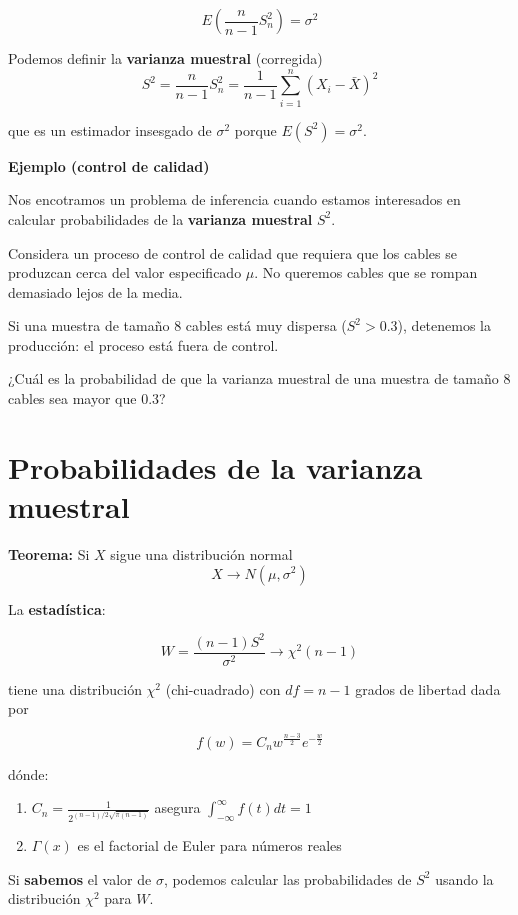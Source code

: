\documentclass[
]{book}
\providecommand{\tightlist}{%
  \setlength{\itemsep}{0pt}\setlength{\parskip}{0pt}}
\begin{document}
\[E(\frac{n}{n-1}S_n^2)=\sigma^2\]

Podemos definir la \textbf{varianza muestral} (corregida) \[S^2=\frac{n}{n-1}S_n^2=\frac{1}{n-1}\sum_{i=1}^n (X_i-\bar{X})^2\]

que es un estimador insesgado de \(\sigma^2\) porque \(E(S^2)=\sigma^2\).

\textbf{Ejemplo (control de calidad)}

Nos encotramos un problema de inferencia cuando estamos interesados en calcular probabilidades de la \textbf{varianza muestral} \(S^2\).

Considera un proceso de control de calidad que requiera que los cables se produzcan cerca del valor especificado \(\mu\). No queremos cables que se rompan demasiado lejos de la media.

Si una muestra de tamaño \(8\) cables está muy dispersa (\(S^2>0.3\)), detenemos la producción: el proceso está fuera de control.

¿Cuál es la probabilidad de que la varianza muestral de una muestra de tamaño \(8\) cables sea mayor que \(0.3\)?

\hypertarget{probabilidades-de-la-varianza-muestral}{%
\section{Probabilidades de la varianza muestral}\label{probabilidades-de-la-varianza-muestral}}

\textbf{Teorema:} Si \(X\) sigue una distribución normal
\[X \rightarrow N(\mu, \sigma^2)\]

La \textbf{estadística}:

\[W=\frac{(n-1)S^2}{\sigma^2} \rightarrow \chi^2(n-1)\]

tiene una distribución \(\chi^2\) (chi-cuadrado) con \(df=n-1\) grados de libertad dada por

\[f(w)=C_n w^{\frac{n-3}{2}} e^{-\frac{w}{2}}\]

dónde:

\begin{enumerate}
\def\labelenumi{\arabic{enumi})}
\tightlist
\item
  \(C_n=\frac{1}{2^{(n-1)/2\sqrt{\pi(n-1)}}}\) asegura \(\int_{-\infty}^{\infty} f (t)dt=1\)
\item
  \(\Gamma(x)\) es el factorial de Euler para números reales
\end{enumerate}

Si \textbf{sabemos} el valor de \(\sigma\), podemos calcular las probabilidades de \(S^2\) usando la distribución \(\chi^2\) para \(W\).
\end{document}
